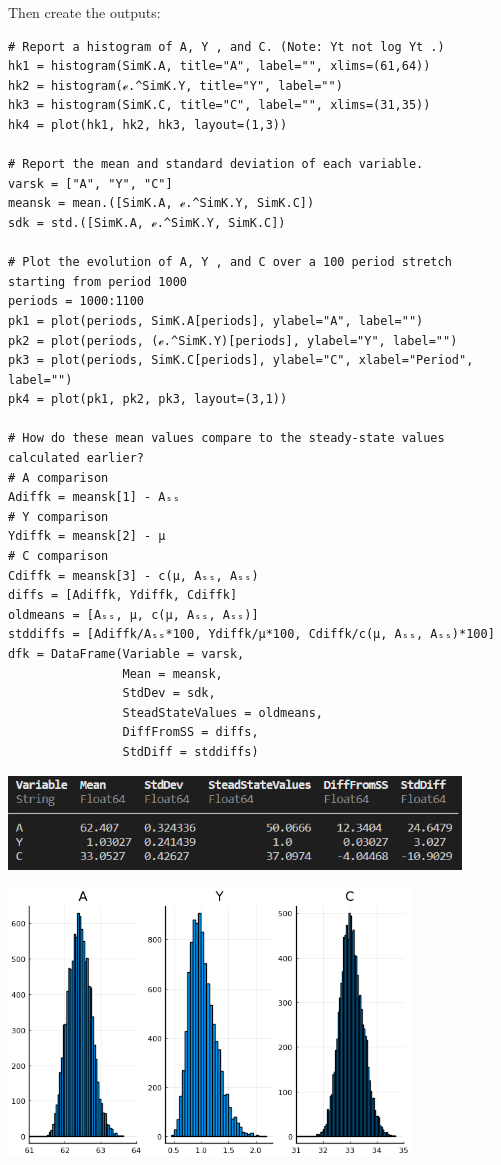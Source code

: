 \documentclass[12pt]{article}
\begin{document}
Then create the outputs:
\begin{lstlisting}[language=JuliaLocal, style=julia]
# Report a histogram of A, Y , and C. (Note: Yt not log Yt .) 
hk1 = histogram(SimK.A, title="A", label="", xlims=(61,64))
hk2 = histogram(ℯ.^SimK.Y, title="Y", label="")
hk3 = histogram(SimK.C, title="C", label="", xlims=(31,35))
hk4 = plot(hk1, hk2, hk3, layout=(1,3))

# Report the mean and standard deviation of each variable. 
varsk = ["A", "Y", "C"]
meansk = mean.([SimK.A, ℯ.^SimK.Y, SimK.C])
sdk = std.([SimK.A, ℯ.^SimK.Y, SimK.C])

# Plot the evolution of A, Y , and C over a 100 period stretch starting from period 1000
periods = 1000:1100
pk1 = plot(periods, SimK.A[periods], ylabel="A", label="")
pk2 = plot(periods, (ℯ.^SimK.Y)[periods], ylabel="Y", label="")
pk3 = plot(periods, SimK.C[periods], ylabel="C", xlabel="Period", label="")
pk4 = plot(pk1, pk2, pk3, layout=(3,1))

# How do these mean values compare to the steady-state values calculated earlier?
# A comparison
Adiffk = meansk[1] - Aₛₛ
# Y comparison
Ydiffk = meansk[2] - μ
# C comparison
Cdiffk = meansk[3] - c(μ, Aₛₛ, Aₛₛ)
diffs = [Adiffk, Ydiffk, Cdiffk]
oldmeans = [Aₛₛ, μ, c(μ, Aₛₛ, Aₛₛ)]
stddiffs = [Adiffk/Aₛₛ*100, Ydiffk/μ*100, Cdiffk/c(μ, Aₛₛ, Aₛₛ)*100]
dfk = DataFrame(Variable = varsk, 
                Mean = meansk, 
                StdDev = sdk, 
                SteadStateValues = oldmeans, 
                DiffFromSS = diffs,
                StdDiff = stddiffs)
\end{lstlisting}


\includegraphics[width=0.9\textwidth]{problem sets/ps8/K-dataframe}

\includegraphics[width=0.8\textwidth]{problem sets/ps8/K-histograms.png}
\end{document}
